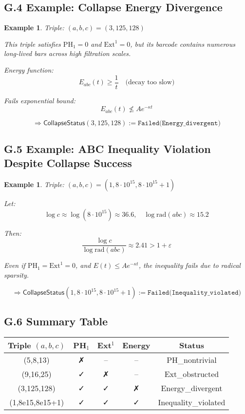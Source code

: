 \documentclass[11pt]{article}
\newtheorem{example}[theorem]{Example}
\begin{document}
\subsection*{G.4 Example: Collapse Energy Divergence}

\begin{example}
Triple: \( (a,b,c) = (3,125,128) \)

\vspace{0.5em}
\noindent
This triple satisfies \( \mathrm{PH}_1 = 0 \) and \( \mathrm{Ext}^1 = 0 \),  
but its barcode contains numerous long-lived bars across high filtration scales.

Energy function:
\[
E_{abc}(t) \geq \frac{1}{t} \quad \text{(decay too slow)}
\]

Fails exponential bound:
\[
E_{abc}(t) \not\leq A e^{-\kappa t}
\]

\[
\Rightarrow \mathsf{CollapseStatus}(3,125,128) := \texttt{Failed(Energy\_divergent)}
\]
\end{example}

\subsection*{G.5 Example: ABC Inequality Violation Despite Collapse Success}

\begin{example}
Triple: \( (a,b,c) = (1, 8\cdot10^{15}, 8\cdot10^{15}+1) \)

\vspace{0.5em}
\noindent
Let:
\[
\log c \approx \log(8\cdot10^{15}) \approx 36.6,\quad
\log \mathrm{rad}(abc) \approx 15.2
\]

Then:
\[
\frac{\log c}{\log \mathrm{rad}(abc)} \approx 2.41 > 1 + \varepsilon
\]

Even if \( \mathrm{PH}_1 = \mathrm{Ext}^1 = 0 \), and \( E(t) \leq A e^{-\kappa t} \),  
the inequality fails due to radical sparsity.

\[
\Rightarrow \mathsf{CollapseStatus}(1,8\cdot10^{15},8\cdot10^{15}+1) := \texttt{Failed(Inequality\_violated)}
\]
\end{example}

\subsection*{G.6 Summary Table}

\begin{center}
\begin{tabular}{|c|c|c|c|c|}
\hline
Triple \( (a,b,c) \) & PH$_1$ & Ext$^1$ & Energy & Status \\
\hline
(5,8,13) & ✗ & – & – & PH\_nontrivial \\
(9,16,25) & ✓ & ✗ & – & Ext\_obstructed \\
(3,125,128) & ✓ & ✓ & ✗ & Energy\_divergent \\
(1,8e15,8e15+1) & ✓ & ✓ & ✓ & Inequality\_violated \\
\hline
\end{tabular}
\end{center}
\end{document}
